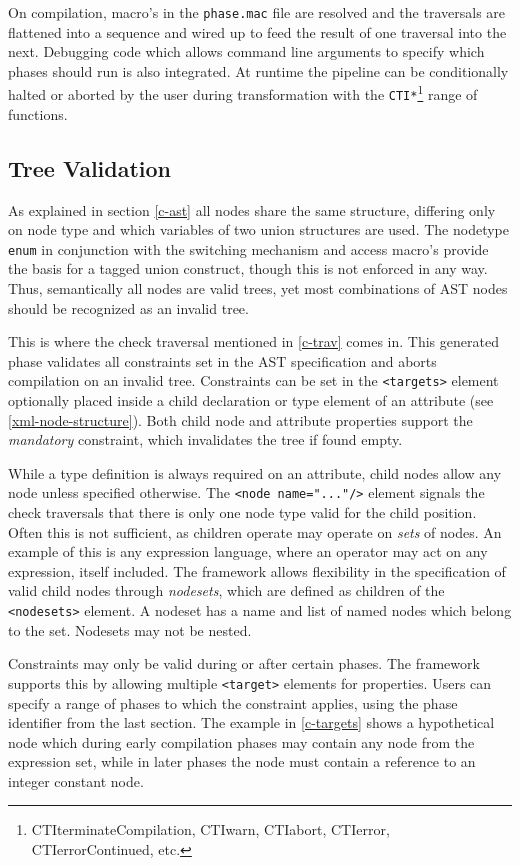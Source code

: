 \documentclass[twoside,openright]{uva-bachelor-thesis}
\newcommand{\code}[1]{\texttt{\footnotesize#1}}
\begin{document}
			On compilation, macro's in the \code{phase.mac} file are resolved and the traversals are flattened into a sequence and wired up to feed the result of one traversal into the next. Debugging code which allows command line arguments to specify which phases should run is also integrated. At runtime the pipeline can be conditionally halted or aborted by the user during transformation with the \code{CTI*}\footnote{CTIterminateCompilation, CTIwarn, CTIabort, CTIerror, CTIerrorContinued, etc.} range of functions.
		
		\subsection{Tree Validation}
		\label{tree-validation}
			As explained in section \cref{c-ast} all nodes share the same structure, differing only on node type and which variables of two union structures are used. The nodetype \code{enum} in conjunction with the switching mechanism and access macro's provide the basis for a tagged union construct, though this is not enforced in any way. Thus, semantically all nodes are valid trees, yet most combinations of AST nodes should be recognized as an invalid tree. 
			
			This is where the check traversal mentioned in \cref{c-trav} comes in. This generated phase validates all constraints set in the AST specification and aborts compilation on an invalid tree. Constraints can be set in the \code{<targets>} element optionally placed inside a child declaration or type element of an attribute (see \cref{xml-node-structure}). Both child node and attribute properties support the \emph{mandatory} constraint, which invalidates the tree if found empty. 
			
			While a type definition is always required on an attribute, child nodes allow any node unless specified otherwise. The \code{<node name="..."/>} element signals the check traversals that there is only one node type valid for the child position. Often this is not sufficient, as children operate may operate on \emph{sets} of nodes. An example of this is any expression language, where an operator may act on any expression, itself included. The framework allows flexibility in the specification of valid child nodes through \emph{nodesets}, which are defined as children of the \code{<nodesets>} element. A nodeset has a name and list of named nodes which belong to the set. Nodesets may not be nested.
			
			Constraints may only be valid during or after certain phases. The framework supports this by allowing multiple \code{<target>} elements for properties. Users can specify a range of phases to which the constraint applies, using the phase identifier from the last section. The example in \cref{c-targets} shows a hypothetical node which during early compilation phases may contain any node from the expression set, while in later phases the node must contain a reference to an integer constant node.
			
\end{document}
